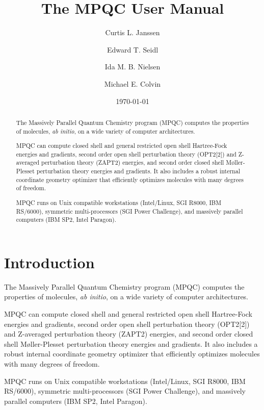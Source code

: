 \documentclass[letterpaper%
              ]{report}
\begin{document}
\title{The MPQC User Manual}

\author{Curtis L. Janssen \and Edward T. Seidl \and Ida M. B. Nielsen
        \and Michael E. Colvin}

\date{\today}

\maketitle

\begin{abstract}
The Massively Parallel Quantum Chemistry program (MPQC) computes
the properties of molecules, {\it ab initio}, on a wide variety
of computer architectures.

\begin{sloppypar}
MPQC can compute closed shell and general restricted open shell
Hartree-Fock energies and gradients, second order open shell
perturbation theory (OPT2[2]) and Z-averaged perturbation theory
(ZAPT2) energies, and second order closed shell M\o{}ller-Plesset
perturbation theory energies and gradients.  It also includes a
robust internal coordinate geometry optimizer that efficiently
optimizes molecules with many degrees of freedom.
\end{sloppypar}

MPQC runs on Unix compatible workstations (Intel/Linux, SGI R8000,
IBM RS/6000), symmetric multi-processors (SGI Power Challenge), and
massively parallel computers (IBM SP2, Intel Paragon).
\end{abstract}

\tableofcontents
\listoftables

\chapter{Introduction}
The Massively Parallel Quantum Chemistry program (MPQC) computes
the properties of molecules, {\it ab initio}, on a wide variety
of computer architectures.

MPQC can compute closed shell and general restricted open shell
Hartree-Fock energies and gradients, second order open shell
perturbation theory (OPT2[2]) and Z-averaged perturbation theory
(ZAPT2) energies, and second order closed shell M\o{}ller-Plesset
perturbation theory energies and gradients.  It also includes a
robust internal coordinate geometry optimizer that efficiently
optimizes molecules with many degrees of freedom.

MPQC runs on Unix compatible workstations (Intel/Linux, SGI R8000,
IBM RS/6000), symmetric multi-processors (SGI Power Challenge),
and massively parallel computers (IBM SP2, Intel Paragon).
\end{document}
